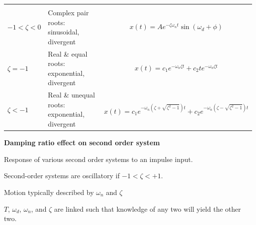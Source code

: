 \documentclass[
]{book}
\begin{document}
\begin{longtable}[]{@{}lll@{}}
\begin{minipage}[t]{0.39\columnwidth}
\end{minipage}\tabularnewline
\begin{minipage}[t]{0.13\columnwidth}\raggedright
\(-1 < \zeta < 0\)\strut
\end{minipage} & \begin{minipage}[t]{0.39\columnwidth}\raggedright
Complex pair roots: sinusoidal, divergent\strut
\end{minipage} & \begin{minipage}[t]{0.39\columnwidth}\raggedright
\[ x\left(t\right) =  A e^{-\zeta \omega_n t} \sin \left( \omega_d + \phi \right) \]\strut
\end{minipage}\tabularnewline
\begin{minipage}[t]{0.13\columnwidth}\raggedright
\(\zeta = -1\)\strut
\end{minipage} & \begin{minipage}[t]{0.39\columnwidth}\raggedright
Real \& equal roots: exponential, divergent\strut
\end{minipage} & \begin{minipage}[t]{0.39\columnwidth}\raggedright
\[ x\left(t\right) = c_1 e^{-\omega_n \zeta t} + c_2 t e^{-\omega_n \zeta t} \]\strut
\end{minipage}\tabularnewline
\begin{minipage}[t]{0.13\columnwidth}\raggedright
\(\zeta < -1\)\strut
\end{minipage} & \begin{minipage}[t]{0.39\columnwidth}\raggedright
Real \& unequal roots: exponential, divergent\strut
\end{minipage} & \begin{minipage}[t]{0.39\columnwidth}\raggedright
\[ x\left(t\right) = c_1 e^{-\omega_n \left( \zeta + \sqrt{\zeta^2 - 1} \right)t} + c_2 e^{-\omega_n \left( \zeta - \sqrt{\zeta^2 - 1} \right)t} \]\strut
\end{minipage}\tabularnewline
\bottomrule
\end{longtable}

\textbf{Damping ratio effect on second order system}

Response of various second order systems to an impulse input.

Second-order systems are oscillatory if \(-1 < \zeta < +1\).

Motion typically described by \(\omega_n\) and \(\zeta\)

\(T\), \(\omega_d\), \(\omega_n\), and \(\zeta\) are linked such that knowledge of any two will yield the other two.
\end{document}
